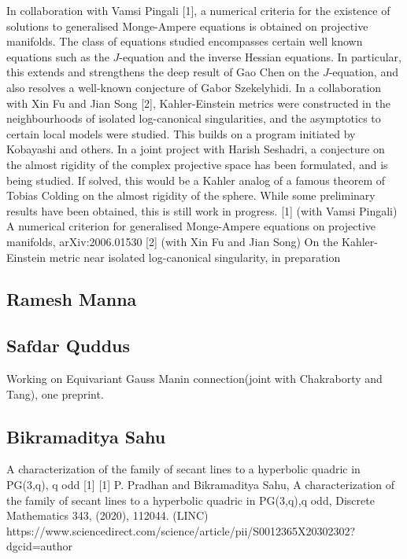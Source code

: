 In collaboration with Vamsi Pingali [1],  a numerical criteria for the existence of solutions to generalised Monge-Ampere equations is obtained  on projective manifolds. The class of equations studied encompasses certain well known equations such as the $J$-equation and the inverse Hessian equations. In particular, this extends and strengthens the deep result of Gao Chen on the $J$-equation, and also resolves a well-known conjecture of Gabor Szekelyhidi.   In a collaboration with Xin Fu and Jian Song [2], Kahler-Einstein metrics were constructed in the neighbourhoods of isolated log-canonical singularities, and the asymptotics to certain local models were studied. This builds on a program initiated by Kobayashi and others.    In a joint project with Harish Seshadri, a conjecture on the almost rigidity of the complex projective space has been formulated, and is being studied. If solved, this would be a Kahler analog of a famous theorem of Tobias Colding on the almost rigidity of the sphere. While some preliminary results have been obtained, this is still work in progress.  [1] (with Vamsi Pingali) A numerical criterion for generalised Monge-Ampere equations on projective manifolds, arXiv:2006.01530 [2] (with Xin Fu and Jian Song) On the Kahler-Einstein metric near isolated log-canonical singularity,  in  preparation\subsection{Ramesh Manna}




\subsection{Safdar Quddus}

Working on Equivariant Gauss Manin connection(joint with Chakraborty and Tang), one preprint.


\subsection{Bikramaditya Sahu}

A characterization of the family of secant lines to a hyperbolic quadric in PG(3,q), q odd [1]  [1] P. Pradhan and Bikramaditya Sahu, A characterization of the family of secant lines to a hyperbolic quadric in PG(3,q),q odd, Discrete Mathematics 343, (2020), 112044.   (LINC) https://www.sciencedirect.com/science/article/pii/S0012365X20302302?dgcid=author 


